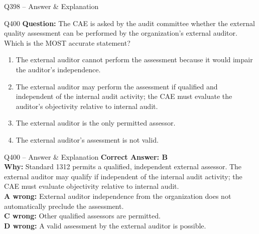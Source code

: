 \documentclass[aspectratio=169,10pt]{beamer}
\begin{document}
\begin{frame}[t]{Q398 -- Answer \& Explanation}
	\begin{frame}[t]{Q400}
		\small
		\textbf{Question:} The CAE is asked by the audit committee whether the external quality assessment can be performed by the organization's external auditor. Which is the MOST accurate statement?
		\begin{enumerate}[label=\Alph*.,itemsep=1pt,topsep=2pt]
			\item The external auditor cannot perform the assessment because it would impair the auditor's independence.
			\item The external auditor may perform the assessment if qualified and independent of the internal audit activity; the CAE must evaluate the auditor's objectivity relative to internal audit.
			\item The external auditor is the only permitted assessor.
			\item The external auditor's assessment is not valid.
		\end{enumerate}
	\end{frame}
	
	\begin{frame}[t]{Q400 -- Answer \& Explanation}
		\small
		\textbf{Correct Answer: B} \\[4pt]
		\textbf{Why:} Standard 1312 permits a qualified, independent external assessor. The external auditor may qualify if independent of the internal audit activity; the CAE must evaluate objectivity relative to internal audit. \\[4pt]
		\textbf{A wrong:} External auditor independence from the organization does not automatically preclude the assessment. \\[2pt]
		\textbf{C wrong:} Other qualified assessors are permitted. \\[2pt]
		\textbf{D wrong:} A valid assessment by the external auditor is possible.
	\end{frame}
	

\end{frame}
\end{document}

